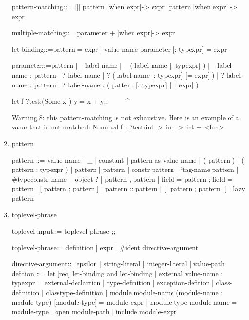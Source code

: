 \begin{enumerate}
\begin{ocamlcode}
pattern-matching::=
 [|] pattern [when expr]-> expr { |pattern  [when expr] ->  expr }  
 
multiple-matching::= { parameter }+  [when expr]-> expr  
 
let-binding::=pattern =  expr  
 	| value-name  { parameter }  [: typexpr] =  expr  
 
parameter::=pattern  
 	| ~ label-name  
 	| ~ ( label-name  [: typexpr] )  
 	| ~ label-name :  pattern  
 	| ? label-name  
 	| ? ( label-name  [: typexpr]  [= expr] )  
 	| ? label-name :  pattern  
 	| ? label-name : (  pattern  [: typexpr]  [= expr] )
\end{ocamlcode}        
      
\begin{alternate}
  let f ?test:(Some x ) y = x + y;;
  ^^^^^^^^^^^^^^^^^^^^^^^^^
\end{alternate}

\begin{ocamlcode}
Warning 8: this pattern-matching is not exhaustive.
Here is an example of a value that is not matched:
None
val f : ?test:int -> int -> int = <fun>
\end{ocamlcode}

  \item pattern

\begin{ocamlcode}
pattern	::=	value-name  
 	| _  
 	| constant  
 	| pattern as  value-name  
 	| ( pattern )  
 	| ( pattern :  typexpr )  
 	| pattern |  pattern  
 	| constr  pattern  
 	| `tag-name  pattern  
 	| #typeconstr-name  -- object ?
 	| pattern  { , pattern }  
 	| { field =  pattern  { ; field =  pattern } }  
 	| [ pattern  { ; pattern } ]  
 	| pattern ::  pattern  
 	| [| pattern  { ; pattern } |]  
 	| lazy pattern
\end{ocamlcode}

  \item toplevel-phrase

\begin{ocamlcode}
toplevel-input::= { toplevel-phrase } ;;  
 
toplevel-phrase::=definition  
 	| expr  
 	| #ident  directive-argument  
 
directive-argument::=epsilon
 	| string-literal  
 	| integer-literal  
 	| value-path
defition ::= let [rec] let-binding {and let-binding}
        | external value-name : typexpr = external-declartion
        | type-definition
        | exception-defition
        | class-definition
        | classtype-definition
        | module module-name {(module-name : module-type)} [:module-type] = module-expr
        | module type module-name = module-type
        | open module-path
        | include module-expr 
\end{ocamlcode}


\end{enumerate}

